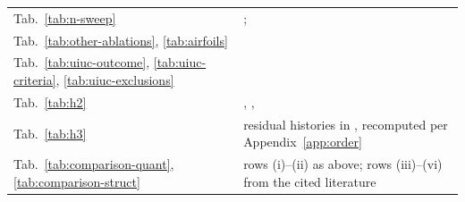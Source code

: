 \begin{table}[htbp]
\begin{tabularx}{\textwidth}{@{}l L@{}}
Tab.~\ref{tab:n-sweep} & ;  \\
Tab.~\ref{tab:other-ablations}, \ref{tab:airfoils} &  \\
Tab.~\ref{tab:uiuc-outcome}, \ref{tab:uiuc-criteria}, \ref{tab:uiuc-exclusions} &  \\
Tab.~\ref{tab:h2} & , ,  \\
Tab.~\ref{tab:h3} & residual histories in , recomputed per Appendix~\ref{app:order} \\
Tab.~\ref{tab:comparison-quant}, \ref{tab:comparison-struct} & rows (i)--(ii) as above; rows (iii)--(vi) from the cited literature \\
\bottomrule
\end{tabularx}
\end{table}
